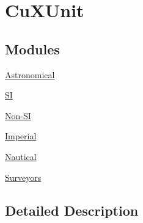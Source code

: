 \hypertarget{group___e_g_x_math-_conversions-_length_conversions-_non-_s_i-_cu_x_unit}{}\section{Cu\+X\+Unit}
\label{group___e_g_x_math-_conversions-_length_conversions-_non-_s_i-_cu_x_unit}
\subsection*{Modules}
\begin{DoxyCompactItemize}
\item 
\mbox{\hyperlink{group___e_g_x_math-_conversions-_length_conversions-_non-_s_i-_cu_x_unit-_astronomical}{Astronomical}}
\item 
\mbox{\hyperlink{group___e_g_x_math-_conversions-_length_conversions-_non-_s_i-_cu_x_unit-_s_i}{SI}}
\item 
\mbox{\hyperlink{group___e_g_x_math-_conversions-_length_conversions-_non-_s_i-_cu_x_unit-_non-_s_i}{Non-\/\+SI}}
\item 
\mbox{\hyperlink{group___e_g_x_math-_conversions-_length_conversions-_non-_s_i-_cu_x_unit-_imperial}{Imperial}}
\item 
\mbox{\hyperlink{group___e_g_x_math-_conversions-_length_conversions-_non-_s_i-_cu_x_unit-_nautical}{Nautical}}
\item 
\mbox{\hyperlink{group___e_g_x_math-_conversions-_length_conversions-_non-_s_i-_cu_x_unit-_surveyors}{Surveyors}}
\end{DoxyCompactItemize}


\subsection{Detailed Description}
